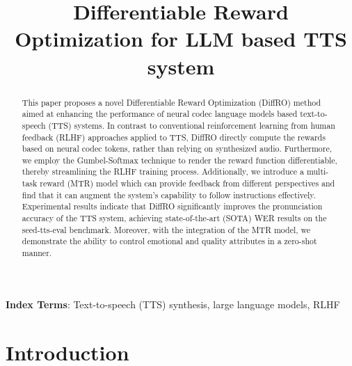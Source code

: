 \documentclass[a4paper]{article}
\title{Differentiable Reward Optimization for LLM based TTS system}
\begin{document}
\maketitle
% 
\begin{abstract}

This paper proposes a novel Differentiable Reward Optimization (DiffRO) method aimed at enhancing the performance of neural codec language models based text-to-speech (TTS) systems. In contrast to conventional reinforcement learning from human feedback (RLHF) approaches applied to TTS, DiffRO directly compute the rewards based on neural codec tokens, rather than relying on synthesized audio. Furthermore, we employ the Gumbel-Softmax technique to render the reward function differentiable, thereby streamlining the RLHF training process. Additionally, we introduce a multi-task reward (MTR) model which can provide feedback from different perspectives and find that it can  augment the system's capability to follow instructions effectively.
Experimental results indicate that DiffRO significantly improves the pronunciation accuracy of the TTS system, achieving state-of-the-art (SOTA) WER results on the seed-tts-eval benchmark. Moreover, with the integration of the MTR model, we demonstrate the ability to control emotional and quality attributes in a zero-shot manner.

\end{abstract}
\noindent\textbf{Index Terms}: Text-to-speech (TTS) synthesis, large language models, RLHF

\section{Introduction}
\end{document}
